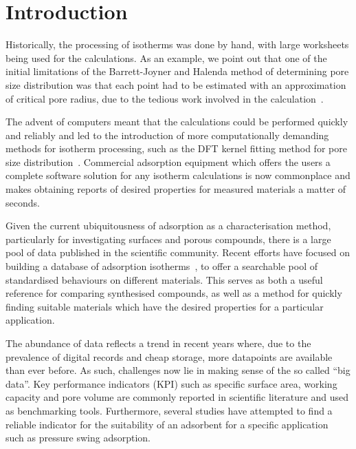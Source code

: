 
\section{Introduction}

Historically, the processing of isotherms was done by hand, with large
worksheets being used for the calculations. As an example,
we point out that one of the initial limitations of the
Barrett-Joyner and Halenda method of determining pore size distribution
was that each point had to be estimated with an approximation of critical
pore radius, due to the tedious work involved in the
calculation~\cite{barrettDeterminationPoreVolume1951}.

The advent of computers meant that the calculations could be performed
quickly and reliably and led to the introduction of more computationally
demanding methods for isotherm processing, such as the DFT kernel fitting
method for pore size distribution~\cite{seatonNewAnalysisMethod1989,%
	tarazonaPhaseEquilibriaFluid1987}.
Commercial adsorption equipment which offers the users
a complete software solution for any isotherm calculations is now
commonplace and makes obtaining reports of desired properties
for measured materials a matter of seconds.

Given the current ubiquitousness of adsorption as a characterisation method,
particularly for investigating surfaces and porous compounds,
there is a large pool of data published in the scientific community.
Recent efforts have focused on building a database of adsorption
isotherms~\cite{sideriusNISTARPAEDatabase2015}, to offer a searchable
pool of standardised behaviours on different materials. This serves as
both a useful reference for comparing synthesised compounds, as well as a
method for quickly finding suitable materials which have the
desired properties for a particular application.

The abundance of data reflects a trend in recent years where, due
to the prevalence of digital records and cheap storage, more
datapoints are available than ever before. As such, challenges
now lie in making sense of the so called ``big data''.
Key performance indicators (KPI) such as specific surface area, working
capacity and pore volume are commonly reported in scientific literature
and used as benchmarking tools. Furthermore,
several studies have attempted to find a reliable indicator for
the suitability of an adsorbent for a specific
application~\cite{regeSimpleParameterSelecting2001, %
	ackley2000psa,%
	wiersumAdsorbentPerformanceIndicator2013} such as pressure swing
adsorption.

